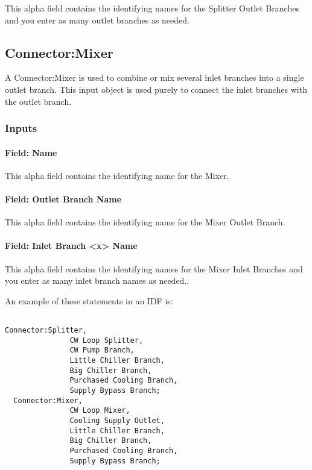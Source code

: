 This alpha field contains the identifying names for the Splitter Outlet Branches and you enter as many outlet branches as needed.

\subsection{Connector:Mixer}\label{connectormixer}

A Connector:Mixer is used to combine or mix several inlet branches into a single outlet branch.  This input object is used purely to connect the inlet branches with the outlet branch.

\subsubsection{Inputs}\label{inputs-1-031}

\paragraph{Field: Name}\label{field-name-1-030}

This alpha field contains the identifying name for the Mixer.

\paragraph{Field: Outlet Branch Name}\label{field-outlet-branch-name}

This alpha field contains the identifying name for the Mixer Outlet Branch.

\paragraph{Field: Inlet Branch \textless{}x\textgreater{} Name}\label{field-inlet-branch-x-name}

This alpha field contains the identifying names for the Mixer Inlet Branches and you enter as many inlet branch names as needed..

An example of these statements in an IDF is:

\begin{lstlisting}

Connector:Splitter,
               CW Loop Splitter,
               CW Pump Branch,
               Little Chiller Branch,
               Big Chiller Branch,
               Purchased Cooling Branch,
               Supply Bypass Branch;
  Connector:Mixer,
               CW Loop Mixer,
               Cooling Supply Outlet,
               Little Chiller Branch,
               Big Chiller Branch,
               Purchased Cooling Branch,
               Supply Bypass Branch;
\end{lstlisting}

